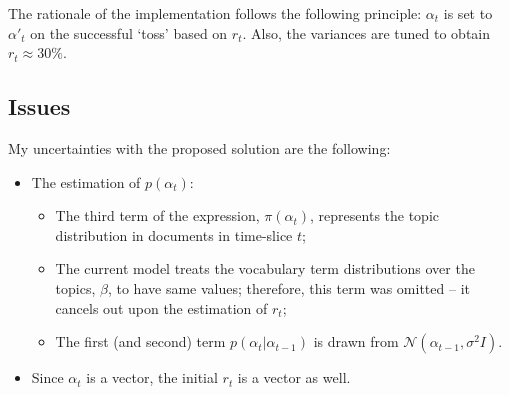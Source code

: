 \documentclass[12pt]{article}
\begin{document}
The rationale of the implementation follows the following principle: $\alpha_t$ is set to $\alpha'_t$ on the successful `toss' based on $r_t$. Also, the variances are tuned to obtain $r_t\approx30\%$.

\subsection*{Issues}
\par My uncertainties with the proposed solution are the following:
\begin{itemize}
\item The estimation of $p(\alpha_t)$:
\begin{itemize}
\item The third term of the expression, $\pi(\alpha_t)$, represents the topic distribution in documents in time-slice $t$;
\item The current model treats the vocabulary term distributions over the topics, $\beta$, to have same values; therefore, this term was omitted -- it cancels out upon the estimation of $r_t$;
\item The first (and second) term $p(\alpha_{t} | \alpha_{t-1})$ is drawn from $\mathcal{N}(\alpha_{t-1}, \sigma^2I)$.
\end{itemize}
\item Since $\alpha_t$ is a vector, the initial $r_t$ is a vector as well.
\end{itemize}


%
\end{document}
